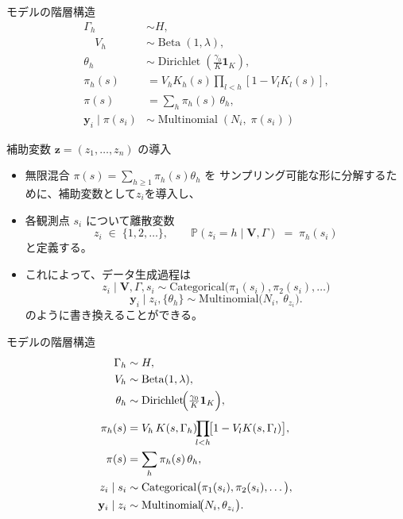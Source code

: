 \documentclass[xelatex, 8pt]{beamer}
\theoremstyle{plain}
\theoremstyle{definition}
\begin{document}
\begin{frame}{モデルの階層構造}
\[
\begin{aligned}
\Gamma_h &\sim H, \\
\quad V_h &\sim \operatorname{Beta}(1, \lambda), \\
\theta_h &\sim \operatorname{Dirichlet}\left(\tfrac{\gamma_0}{K}\mathbf{1}_K\right), \\
\pi_h(s) &= V_h K_h(s) \prod_{l < h} [1 - V_l K_l(s)], \\
\pi(s) &= \sum_h \pi_h(s)\, \theta_h, \\
\mathbf{y}_i \mid \pi(s_i) &\sim \operatorname{Multinomial}(N_i,\; \pi(s_i))
\end{aligned}
\]

\end{frame}

\begin{frame}{補助変数 \(\boldsymbol z=(z_1,\dots,z_n)\) の導入}
\begin{itemize}
\item
      無限混合 \(\displaystyle\pi(s)=\sum_{h\ge1}\pi_h(s)\theta_h\) を
      サンプリング可能な形に分解するために、補助変数として$z_i$を導入し、
\item
      各観測点 \(s_i\) について離散変数
      \[
        z_i \;\in\;\{1,2,\dots\},\qquad
        \mathbb P(z_i=h\mid\mathbf V,\Gamma)
        \;=\;\pi_h(s_i)
      \]
      と定義する。
\item これによって、データ生成過程は
      \[
        z_i\mid \mathbf V,\Gamma,s_i \sim \mathrm{Categorical}\bigl(\pi_1(s_i),\pi_2(s_i),\dots\bigr)
      \]
      \[
        \mathbf y_i \mid z_i,\{\theta_h\} \sim
        \mathrm{Multinomial}\bigl(N_i,\;\theta_{z_i}\bigr).
      \]
      のように書き換えることができる。

\end{itemize}
\end{frame}

\begin{frame}{モデルの階層構造}
\[
\begin{aligned}
\Gamma_h &\sim H, \\
V_h &\sim\operatorname{Beta}(1,\lambda),\\
\theta_h &\sim\operatorname{Dirichlet}\!\Bigl(\tfrac{\gamma_0}{K}\mathbf 1_K\Bigr),
& & \\[4pt]
\pi_h(s) &= V_h\,K(s,\Gamma_h)\!\!\prod_{l<h}\!\bigl[1-V_lK(s,\Gamma_l)\bigr],\\
\pi(s) &= \sum_{h}\pi_h(s)\,\theta_h,\\
z_i \mid s_i &\sim\mathrm{Categorical}\bigl(\pi_1(s_i),\pi_2(s_i),\dots\bigr), \\
\mathbf y_i \mid z_i &\sim\mathrm{Multinomial}\!\bigl(N_i,\theta_{z_i}\bigr).
\end{aligned}
\]
\end{frame}
\end{document}
